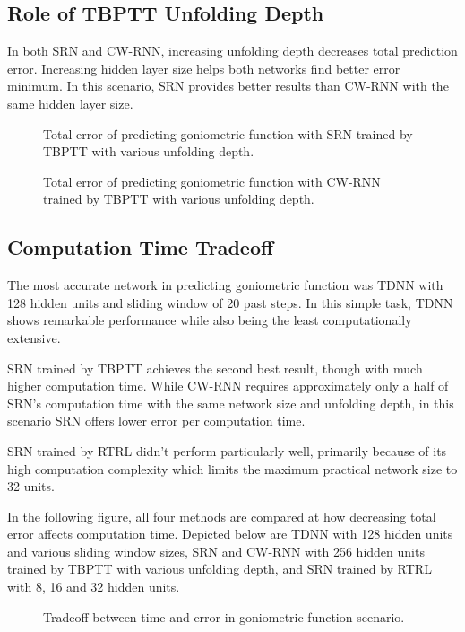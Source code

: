 \documentclass[12pt,oneside]{fithesis2}
\begin{document}
\subsection{Role of TBPTT Unfolding Depth}
In both SRN and CW-RNN, increasing unfolding depth decreases total prediction error. Increasing hidden layer size helps both networks find better error minimum. In this scenario, SRN provides better results than CW-RNN with the same hidden layer size.

	\begin{figure}[H]
		\caption{Total error of predicting goniometric function with SRN trained by TBPTT with various unfolding depth.}
		

		\caption{Total error of predicting goniometric function with CW-RNN trained by TBPTT with various unfolding depth.}
		
	\end{figure}

\subsection{Computation Time Tradeoff}
The most accurate network in predicting goniometric function was TDNN with 128 hidden units and sliding window of 20 past steps. In this simple task, TDNN shows remarkable performance while also being the least computationally extensive. \par
SRN trained by TBPTT achieves the second best result, though with much higher computation time. While CW-RNN requires approximately only a half of SRN's computation time with the same network size and unfolding depth, in this scenario SRN offers lower error per computation time.\par
SRN trained by RTRL didn't perform particularly well, primarily because of its high computation complexity which limits the maximum practical network size to 32 units.\par
In the following figure, all four methods are compared at how decreasing total error affects computation time. Depicted below are TDNN with 128 hidden units and various sliding window sizes, SRN and CW-RNN with 256 hidden units trained by TBPTT with various unfolding depth, and SRN trained by RTRL with 8, 16 and 32 hidden units.

	\begin{figure}[H]
		\caption{Tradeoff between time and error in goniometric function scenario.}
		
	\end{figure}
\end{document}
